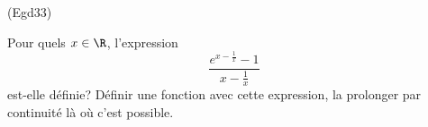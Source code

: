\begin{tiny}(Egd33)\end{tiny} Pour quels $x\in \R$, l'expression
\[
 \frac{e^{x-\frac{1}{x}}-1}{x-\frac{1}{x}}
\]
est-elle définie? Définir une fonction avec cette expression, la prolonger par continuité là où c'est possible.